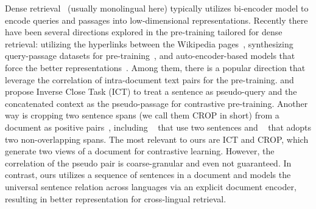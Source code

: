 \documentclass{article} %
\begin{document}
\label{subsec:dr}
Dense retrieval~\citep{DPR2020, lee-etal-2019-latent, qu-etal-2021-rocketqa, ance2020} (usually monolingual here) typically utilizes bi-encoder model to encode queries and passages into low-dimensional representations. 
Recently there have been several directions explored in the pre-training tailored for dense retrieval: utilizing the hyperlinks between the Wikipedia pages~\citep{ma2021pre, zhou-etal-2022-hyperlink}, synthesizing query-passage datasets for pre-training~\citep{ouguz2021dprpaq, reddy2021towards}, and auto-encoder-based models that force the better representations~\citep{lu-etal-2021-less, ma2022pre}. 
Among them, there is a popular direction that leverage the correlation of intra-document text pairs for the pre-training. \citet{lee-etal-2019-latent} and \citet{chang2020pre} propose Inverse Close Task (ICT) to treat a sentence as pseudo-query and the concatenated context as the pseudo-passage for contrastive pre-training. Another way is cropping two sentence spans (we call them CROP in short) from a document as positive pairs~\citep{giorgi-etal-2021-declutr, izacard2021towards}, including ~\citet{wu2022unsupervised, iter-etal-2020-pretraining} that use two sentences and ~\citet{gao2021cocondenser} that adopts two non-overlapping spans.
The most relevant to ours are ICT and CROP, which generate two views of a document for contrastive learning. However, the correlation of the pseudo pair is coarse-granular and even not guaranteed. In contrast, ours utilizes a sequence of sentences in a document and models the universal sentence relation across languages via an explicit document encoder, resulting in better representation for cross-lingual retrieval.



\end{document}
